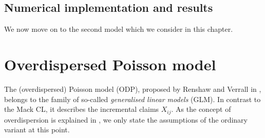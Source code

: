 \documentclass[a4paper]{book}
\begin{document}
\subsection{Numerical implementation and results} \label{sec:mack-results}


We now move on to the second model which we consider in this chapter. 

\section{Overdispersed Poisson model}

The (overdispersed) Poisson model (ODP), proposed by Renshaw and Verrall in \cite{renshaw}, belongs to the family of so-called \emph{generalised linear models} (GLM). In contrast to the Mack CL, it describes the incremental claims $X_{ij}$. As the concept of overdispersion is explained in , we only state the assumptions of the ordinary variant at this point.
\end{document}
